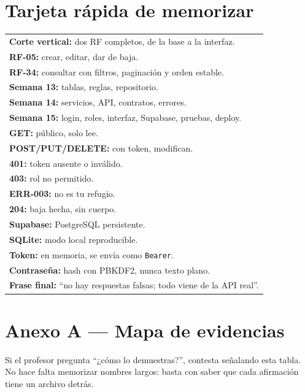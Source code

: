 \documentclass[11pt,a4paper]{article}
\newcommand{\code}[1]{\texttt{#1}}
\begin{document}
\clearpage

\section{Tarjeta rápida de memorizar}

\begin{center}
\begin{tabularx}{0.95\linewidth}{@{}X@{}}
\toprule
\textbf{Corte vertical:} dos RF completos, de la base a la interfaz. \\[3pt]
\textbf{RF-05:} crear, editar, dar de baja. \\
\textbf{RF-34:} consultar con filtros, paginación y orden estable. \\[3pt]
\textbf{Semana 13:} tablas, reglas, repositorio. \\
\textbf{Semana 14:} servicios, API, contratos, errores. \\
\textbf{Semana 15:} login, roles, interfaz, Supabase, pruebas, deploy. \\[3pt]
\textbf{GET:} público, solo lee. \\
\textbf{POST/PUT/DELETE:} con token, modifican. \\[3pt]
\textbf{401:} token ausente o inválido. \\
\textbf{403:} rol no permitido. \\
\textbf{ERR-003:} no es tu refugio. \\
\textbf{204:} baja hecha, sin cuerpo. \\[3pt]
\textbf{Supabase:} PostgreSQL persistente. \\
\textbf{SQLite:} modo local reproducible. \\
\textbf{Token:} en memoria, se envía como \code{Bearer}. \\
\textbf{Contraseña:} hash con PBKDF2, nunca texto plano. \\[3pt]
\textbf{Frase final:} ``no hay respuestas falsas; todo viene de la API real''. \\
\bottomrule
\end{tabularx}
\end{center}

\clearpage

\section{Anexo A --- Mapa de evidencias}

Si el profesor pregunta ``¿cómo lo demuestras?'', contesta señalando esta tabla.
No hace falta memorizar nombres largos: basta con saber que cada afirmación
tiene un archivo detrás.
\end{document}
